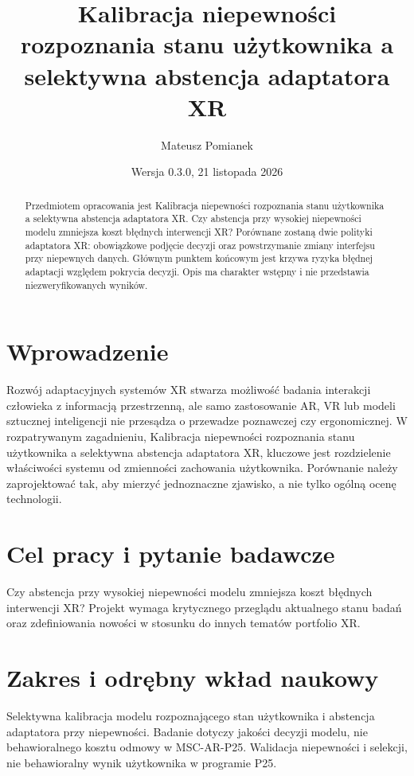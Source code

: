 \documentclass[11pt,a4paper]{article}
\title{Kalibracja niepewności rozpoznania stanu użytkownika a selektywna abstencja adaptatora XR}
\author{Mateusz Pomianek}
\date{Wersja 0.3.0, 21 listopada 2026}
\begin{document}
\maketitle

\begin{abstract}

Przedmiotem opracowania jest Kalibracja niepewności rozpoznania stanu użytkownika a selektywna abstencja adaptatora XR. Czy abstencja przy wysokiej niepewności modelu zmniejsza koszt błędnych interwencji XR? Porównane zostaną dwie polityki adaptatora XR: obowiązkowe podjęcie decyzji oraz powstrzymanie zmiany interfejsu przy niepewnych danych. Głównym punktem końcowym jest krzywa ryzyka błędnej adaptacji względem pokrycia decyzji. Opis ma charakter wstępny i nie przedstawia niezweryfikowanych wyników.

\end{abstract}

\section{Wprowadzenie}

Rozwój adaptacyjnych systemów XR stwarza możliwość badania interakcji człowieka z informacją przestrzenną, ale samo zastosowanie AR, VR lub modeli sztucznej inteligencji nie przesądza o przewadze poznawczej czy ergonomicznej. W rozpatrywanym zagadnieniu, Kalibracja niepewności rozpoznania stanu użytkownika a selektywna abstencja adaptatora XR, kluczowe jest rozdzielenie właściwości systemu od zmienności zachowania użytkownika. Porównanie należy zaprojektować tak, aby mierzyć jednoznaczne zjawisko, a nie tylko ogólną ocenę technologii.

\section{Cel pracy i pytanie badawcze}

Czy abstencja przy wysokiej niepewności modelu zmniejsza koszt błędnych interwencji XR? Projekt wymaga krytycznego przeglądu aktualnego stanu badań oraz zdefiniowania nowości w stosunku do innych tematów portfolio XR.

\section{Zakres i odrębny wkład naukowy}
Selektywna kalibracja modelu rozpoznającego stan użytkownika i abstencja adaptatora przy niepewności. Badanie dotyczy jakości decyzji modelu, nie behawioralnego kosztu odmowy w MSC-AR-P25. Walidacja niepewności i selekcji, nie behawioralny wynik użytkownika w programie P25.
\end{document}
